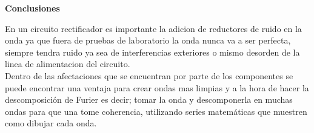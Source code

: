 \documentclass[letterpaper]{article}
\begin{document}
    
    
    
    
    
    
    
    
    
    
    
    
    \begin{LARGE}
            \textbf{Conclusiones}\\
    \end{LARGE}
    
        \begin{large}    
       En un circuito rectificador es importante la adicion de reductores de ruido en la onda ya que fuera de pruebas de laboratorio la  onda nunca va a ser perfecta, siempre tendra ruido ya sea de interferencias exteriores o mismo desorden de la linea de alimentacion del circuito.\\
        Dentro de las afectaciones que se encuentran por parte de los componentes se puede encontrar una ventaja para crear ondas mas limpias y a la hora de hacer la descomposición de Furier es decir; tomar la onda y descomponerla en muchas ondas para que una tome coherencia, utilizando series matemáticas que muestren como dibujar cada onda.
        
        \end{large}
\end{document}
